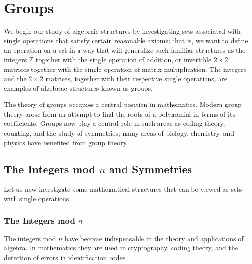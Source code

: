 \chapter{Groups}\label{groups}

We begin our study of  algebraic structures by investigating sets associated with single operations that satisfy certain reasonable axioms; that is, we want to define an operation on a set in a way that will generalize such familiar structures as the integers ${\mathbb Z}$ together with the single operation of  addition, or invertible $2 \times 2$ matrices together with the single operation of matrix multiplication.  The integers and the $2 \times 2$ matrices, together with their respective single operations, are examples of algebraic structures known as groups. 

The theory of groups occupies a central position in mathematics.  Modern group theory arose from an attempt to find the roots of a polynomial in terms of its coefficients.  Groups now play a central role in such areas as coding theory, counting, and the study of  symmetries; many areas of biology, chemistry, and physics have benefited from group theory.

 
\section{The Integers mod $n$ and Symmetries}\label{groups_section_1}
 
Let us now investigate some mathematical structures that can be viewed as sets with single operations. 
 
 
\subsection*{The Integers mod $n$}

The integers mod $n$ have become indispensable in the theory and applications of algebra.  In mathematics they are used in cryptography, coding theory, and the detection of errors in identification codes.
 
